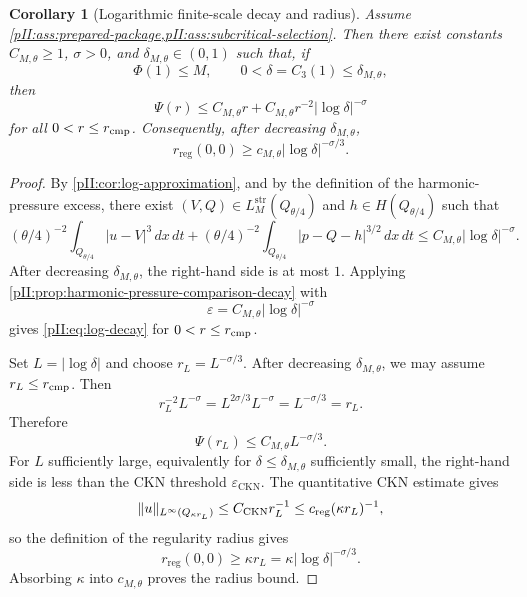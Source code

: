 \documentclass[11pt]{article}
\numberwithin{equation}{section}
\theoremstyle{plain}
\newtheorem{corollary}{Corollary}[section]
\theoremstyle{definition}
\theoremstyle{remark}
\newcommand{\eps}{\varepsilon}
\newcommand{\reg}{\mathrm{reg}}
\newcommand{\str}{\mathrm{str}}
\newcommand{\CKN}{\mathrm{CKN}}
\begin{document}
\begin{corollary}[Logarithmic finite-scale decay and radius]\label{pII:cor:log-radius}
Assume \cref{pII:ass:prepared-package,pII:ass:subcritical-selection}.  Then there exist constants $C_{M,\theta}\ge1$, $\sigma>0$, and $\delta_{M,\theta}\in(0,1)$ such that, if
\[
        \Phi(1)\le M,
        \qquad
        0<\delta=C_3(1)\le\delta_{M,\theta},
\]
then
\begin{equation}\label{pII:eq:log-decay}
        \Psi(r)
        \le
        C_{M,\theta}r
        +
        C_{M,\theta}r^{-2}|\log\delta|^{-\sigma}
\end{equation}
for all $0<r\le r_{\rm cmp}$.  Consequently, after decreasing $\delta_{M,\theta}$,
\begin{equation}\label{pII:eq:log-radius}
        r_{\reg}(0,0)
        \ge
        c_{M,\theta}|\log\delta|^{-\sigma/3}.
\end{equation}
\end{corollary}

\begin{proof}
By \cref{pII:cor:log-approximation}, and by the definition of the harmonic-pressure excess, there exist $(V,Q)\in L_M^{\str}(Q_{\theta/4})$ and $h\in H(Q_{\theta/4})$ such that
\[
        (\theta/4)^{-2}\int_{Q_{\theta/4}}|u-V|^3\,dx\,dt
        +
        (\theta/4)^{-2}\int_{Q_{\theta/4}}|p-Q-h|^{3/2}\,dx\,dt
        \le
        C_{M,\theta}|\log\delta|^{-\sigma}.
\]
After decreasing $\delta_{M,\theta}$, the right-hand side is at most $1$.  Applying \cref{pII:prop:harmonic-pressure-comparison-decay} with
\[
        \varepsilon=C_{M,\theta}|\log\delta|^{-\sigma}
\]
gives \eqref{pII:eq:log-decay} for $0<r\le r_{\rm cmp}$.

Set $L=|\log\delta|$ and choose $r_L=L^{-\sigma/3}$.  After decreasing $\delta_{M,\theta}$, we may assume $r_L\le r_{\rm cmp}$.  Then
\[
        r_L^{-2}L^{-\sigma}=L^{2\sigma/3}L^{-\sigma}=L^{-\sigma/3}=r_L.
\]
Therefore
\[
        \Psi(r_L)
        \le
        C_{M,\theta}L^{-\sigma/3}.
\]
For $L$ sufficiently large, equivalently for $\delta\le\delta_{M,\theta}$ sufficiently small, the right-hand side is less than the CKN threshold $\eps_{\CKN}$.  The quantitative CKN estimate gives
\[
        \|u\|_{L^\infty(Q_{\kappa r_L})}\le C_{\CKN}r_L^{-1}
        \le c_{\rm reg}(\kappa r_L)^{-1},
\]
so the definition of the regularity radius gives
\[
        r_{\reg}(0,0)
        \ge
        \kappa r_L
        =
        \kappa |\log\delta|^{-\sigma/3}.
\]
Absorbing $\kappa$ into $c_{M,\theta}$ proves the radius bound.
\end{proof}
\end{document}
